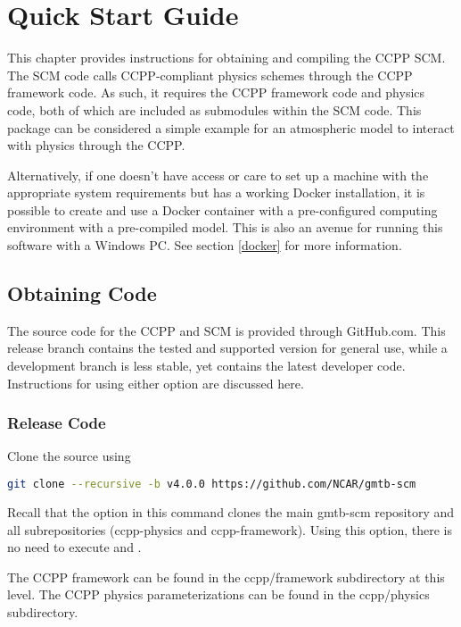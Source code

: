 \chapter{Quick Start Guide}
\label{chapter: quick}

This chapter provides instructions for obtaining and compiling the CCPP SCM. The SCM code calls CCPP-compliant physics schemes through the CCPP framework code. As such, it requires the CCPP framework code and physics code, both of which are included as submodules within the SCM code. This package can be considered a simple example for an atmospheric model to interact with physics through the CCPP. 

Alternatively, if one doesn't have access or care to set up a machine with the appropriate system requirements but has a working Docker installation, it is possible to create and use a Docker container with a pre-configured computing environment with a pre-compiled model. This is also an avenue for running this software with a Windows PC. See section \ref{docker} for more information.

\section{Obtaining Code}
\label{obtaining_code}

The source code for the CCPP and SCM is provided through GitHub.com.  This release branch contains the tested and supported version for general use, while a development branch is less stable, yet contains the latest developer code. Instructions for using either option are discussed here.

\subsection{Release Code}

Clone the source using
\begin{lstlisting}[language=bash]
git clone --recursive -b v4.0.0 https://github.com/NCAR/gmtb-scm
\end{lstlisting}
             Recall that the  option in this command clones the main gmtb-scm repository and all subrepositories (ccpp-physics and ccpp-framework). Using this option, there is no need to execute  and .

The CCPP framework can be found in the ccpp/framework subdirectory at this level.  The CCPP physics parameterizations can be found in the ccpp/physics subdirectory.


